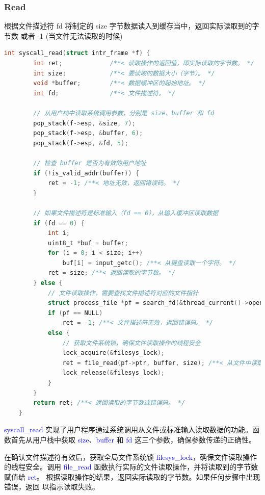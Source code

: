 \documentclass[14pt,a4paper,UTF8,twoside]{article}
\renewcommand{\texttt}[1]{\textcolor{blue}{\ttfamily #1}}
\begin{document}
\subsubsection{Read}

根据文件描述符 fd 将制定的 size 字节数据读入到缓存当中，返回实际读取到的字节数
或者 -1 (当文件无法读取的时候)

\begin{lstlisting}[language=C, title= syscall\_read()]
    int syscall_read(struct intr_frame *f) {
        int ret;             /**< 读取操作的返回值，即实际读取的字节数。 */
        int size;            /**< 要读取的数据大小（字节）。 */
        void *buffer;        /**< 数据缓冲区的起始地址。 */
        int fd;              /**< 文件描述符。 */
    
        // 从用户栈中读取系统调用参数，分别是 size、buffer 和 fd
        pop_stack(f->esp, &size, 7);
        pop_stack(f->esp, &buffer, 6);
        pop_stack(f->esp, &fd, 5);
    
        // 检查 buffer 是否为有效的用户地址
        if (!is_valid_addr(buffer)) {
            ret = -1; /**< 地址无效，返回错误码。 */
        }
    
        // 如果文件描述符是标准输入（fd == 0），从输入缓冲区读取数据
        if (fd == 0) {
            int i;
            uint8_t *buf = buffer;
            for (i = 0; i < size; i++)
                buf[i] = input_getc(); /**< 从键盘读取一个字符。 */
            ret = size; /**< 返回读取的字节数。 */
        } else {
            // 文件读取操作，需要查找文件描述符对应的文件指针
            struct process_file *pf = search_fd(&thread_current()->opened_files, fd);
            if (pf == NULL)
                ret = -1; /**< 文件描述符无效，返回错误码。 */
            else {
                // 获取文件系统锁，确保文件读取操作的线程安全
                lock_acquire(&filesys_lock);
                ret = file_read(pf->ptr, buffer, size); /**< 从文件中读取数据，返回实际读取的字节数。 */
                lock_release(&filesys_lock);
            }
        }
        return ret; /**< 返回读取的字节数或错误码。 */
    }
    \end{lstlisting}
    
    \begin{cth}
    
    \texttt{syscall\_read} 实现了用户程序通过系统调用从文件或标准输入读取数据的功能。函数首先从用户栈中获取 \texttt{size}、\texttt{buffer} 和 \texttt{fd} 这三个参数，确保参数传递的正确性。
    
    在确认文件描述符有效后，获取全局文件系统锁 \texttt{filesys\_lock}，确保文件读取操作的线程安全。调用 \texttt{file\_read} 函数执行实际的文件读取操作，并将读取到的字节数赋值给 \texttt{ret}。
    根据读取操作的结果，返回实际读取的字节数。如果任何步骤中出现错误，返回 \texttt{-1} 以指示读取失败。
    \end{cth}
\end{document}
